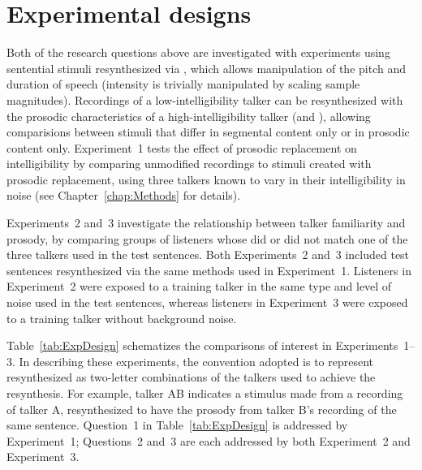\section{Experimental designs}
Both of the research questions above are investigated with experiments using sentential stimuli resynthesized via \psola{} \citep{MoulinesCharpentier1990}, which allows manipulation of the pitch and duration of speech (intensity is trivially manipulated by scaling sample magnitudes).  Recordings of a low-intelligibility talker can be resynthesized with the prosodic characteristics of a high-intelligibility talker (and \vv), allowing comparisions between stimuli that differ in segmental content only or in prosodic content only.  Experiment~1 tests the effect of prosodic replacement on intelligibility by comparing unmodified recordings to stimuli created with prosodic replacement, using three talkers known to vary in their intelligibility in noise (see Chapter~\ref{chap:Methods} for details).

Experiments~2 and~3 investigate the relationship between talker familiarity and prosody, by comparing groups of listeners whose  did or did not match one of the three talkers used in the test sentences.  Both Experiments~2 and~3 included test sentences resynthesized via the same methods used in Experiment~1.  Listeners in Experiment~2 were exposed to a training talker in the same type and level of noise used in the test sentences, whereas listeners in Experiment~3 were exposed to a training talker without background noise.

Table~\ref{tab:ExpDesign} schematizes the comparisons of interest in Experiments~1–3.  In describing these experiments, the convention adopted is to represent resynthesized  as two-letter combinations of the talkers used to achieve the resynthesis.  For example, talker AB indicates a stimulus made from a recording of talker A, resynthesized to have the prosody from talker B’s recording of the same sentence.  Question~1 in Table~\ref{tab:ExpDesign} is addressed by Experiment~1; Questions~2 and~3 are each addressed by both Experiment~2 and Experiment~3.

